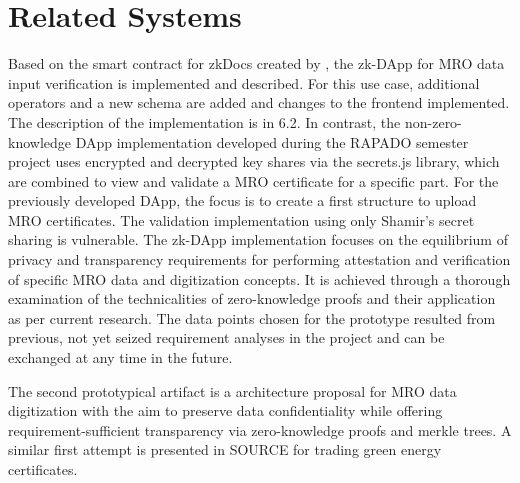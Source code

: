 \section{Related Systems}
Based on the smart contract for zkDocs created by \citep{zkdocs}, the zk-DApp for MRO data input verification is implemented and described. For this use case, additional operators and a new schema are added and changes to the frontend implemented. The description of the implementation is in 6.2. In contrast, the non-zero-knowledge DApp implementation developed during the RAPADO semester project uses encrypted and decrypted key shares via the secrets.js library, which are combined to view and validate a MRO certificate for a specific part. For the previously developed DApp, the focus is to create a first structure to upload MRO certificates. The validation implementation using only Shamir's secret sharing is vulnerable. The zk-DApp implementation focuses on the equilibrium of privacy and transparency requirements for performing attestation and verification of specific MRO data and digitization concepts. It is achieved through a thorough examination of the technicalities of zero-knowledge proofs and their application as per current research. The data points chosen for the prototype resulted from previous, not yet seized requirement analyses in the project and can be exchanged at any time in the future. 

The second prototypical artifact is a architecture proposal for MRO data digitization with the aim to preserve data confidentiality while offering requirement-sufficient transparency via zero-knowledge proofs and merkle trees. A similar first attempt is presented in SOURCE for trading green energy certificates. 
